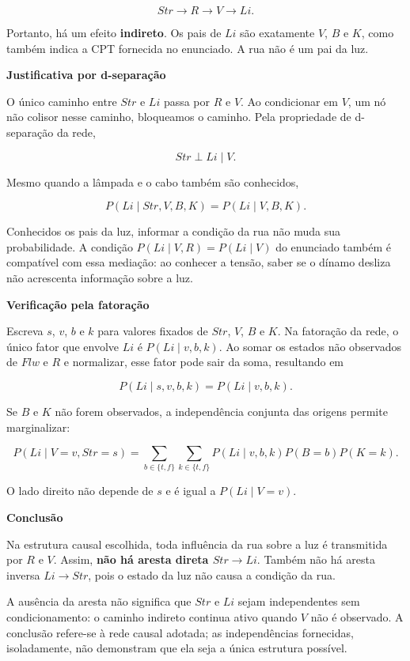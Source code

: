 \documentclass[11pt,a4paper]{article}
\newcommand{\subtitulo}[1]{\par\medskip\textbf{\textcolor{accent}{#1}}\par}
\begin{document}
\[
Str\longrightarrow R\longrightarrow V\longrightarrow Li.
\]

Portanto, há um efeito \textbf{indireto}. Os pais de \(Li\) são exatamente \(V\), \(B\) e \(K\), como também indica a CPT fornecida no enunciado. A rua não é um pai da luz.

\subtitulo{Justificativa por d-separação}\label{justificativa-por-d-separauxe7uxe3o}

O único caminho entre \(Str\) e \(Li\) passa por \(R\) e \(V\). Ao condicionar em \(V\), um nó não colisor nesse caminho, bloqueamos o caminho. Pela propriedade de d-separação da rede,

\[
Str\perp Li\mid V.
\]

Mesmo quando a lâmpada e o cabo também são conhecidos,

\[
P(Li\mid Str,V,B,K)=P(Li\mid V,B,K).
\]

Conhecidos os pais da luz, informar a condição da rua não muda sua probabilidade. A condição \(P(Li\mid V,R)=P(Li\mid V)\) do enunciado também é compatível com essa mediação: ao conhecer a tensão, saber se o dínamo desliza não acrescenta informação sobre a luz.

\subtitulo{Verificação pela fatoração}\label{verificauxe7uxe3o-pela-fatorauxe7uxe3o}

Escreva \(s\), \(v\), \(b\) e \(k\) para valores fixados de \(Str\), \(V\), \(B\) e \(K\). Na fatoração da rede, o único fator que envolve \(Li\) é \(P(Li\mid v,b,k)\). Ao somar os estados não observados de \(Flw\) e \(R\) e normalizar, esse fator pode sair da soma, resultando em

\[
P(Li\mid s,v,b,k)=P(Li\mid v,b,k).
\]

Se \(B\) e \(K\) não forem observados, a independência conjunta das origens permite marginalizar:

\[
P(Li\mid V=v,Str=s)
=\sum_{b\in\{t,f\}}\sum_{k\in\{t,f\}}
P(Li\mid v,b,k)P(B=b)P(K=k).
\]

O lado direito não depende de \(s\) e é igual a \(P(Li\mid V=v)\).

\subtitulo{Conclusão}\label{conclusuxe3o}

Na estrutura causal escolhida, toda influência da rua sobre a luz é transmitida por \(R\) e \(V\). Assim, \textbf{não há aresta direta \(Str\to Li\)}. Também não há aresta inversa \(Li\to Str\), pois o estado da luz não causa a condição da rua.

A ausência da aresta não significa que \(Str\) e \(Li\) sejam independentes sem condicionamento: o caminho indireto continua ativo quando \(V\) não é observado. A conclusão refere-se à rede causal adotada; as independências fornecidas, isoladamente, não demonstram que ela seja a única estrutura possível.
\end{document}
